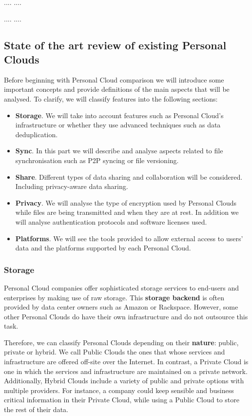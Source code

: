 ....
....

....
....

\subsection{State of the art review of existing Personal Clouds}


Before beginning with Personal Cloud comparison we will introduce some important concepts and provide definitions of the main aspects that will be analysed. To clarify, we will classify features into the following sections:

\begin{itemize}
\item \textbf{Storage}. We will take into account features such as Personal Cloud's infrastructure or whether they use advanced techniques such as data deduplication.
\item \textbf{Sync}. In this part we will describe and analyse aspects related to file synchronisation such as P2P syncing or file versioning. 
\item \textbf{Share}. Different types of data sharing and collaboration will be considered. Including privacy-aware data sharing.
\item \textbf{Privacy}. We will analyse the type of encryption used by Personal Clouds while files are being transmitted and when they are at rest. In addition we will analyse authentication protocols and software licenses used.
\item \textbf{Platforms}. We will see the tools provided to allow external access to users' data and the platforms supported by each Personal Cloud.
\end{itemize}


\subsubsection{Storage}

Personal Cloud companies offer sophisticated storage services to end-users and enterprises by making use of raw storage. This \textbf{storage backend} is often provided by data center owners such as Amazon or Rackspace. However, some other Personal Clouds do have their own infrastructure and do not outsource this task.

Therefore, we can classify Personal Clouds depending on their \textbf{nature}: public, private or hybrid. We call Public Clouds the ones that whose services and infrastructure are offered off-site over the Internet. In contrast, a Private Cloud is one in which the services and infrastructure are maintained on a private network. Additionally, Hybrid Clouds include a variety of public and private options with multiple providers. For instance, a company could keep sensible and business critical information in their Private Cloud, while using a Public Cloud to store the rest of their data.

